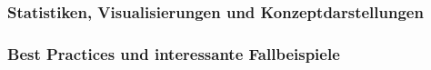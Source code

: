 \documentclass[a4paper, 11pt]{article} %
\begin{document}
\subsubsection{Statistiken, Visualisierungen und Konzeptdarstellungen}


\subsubsection{Best Practices und interessante Fallbeispiele}






\end{document}
